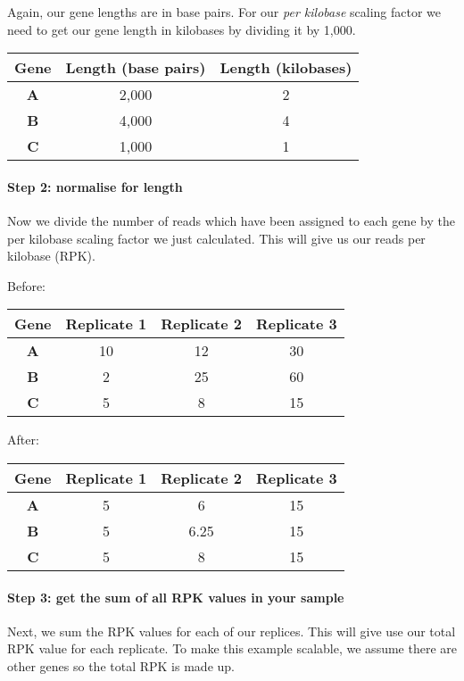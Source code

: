 \documentclass[11pt]{article}
\begin{document}
Again, our gene lengths are in base pairs. For our \textit{per kilobase}
scaling factor we need to get our gene length in kilobases by dividing
it by 1,000.

\begin{longtable}[]{@{}ccc@{}}
\hline
Gene & Length (base pairs) & Length (kilobases)\tabularnewline
\hline
\endhead
\textbf{A} & 2,000 & 2\tabularnewline
\textbf{B} & 4,000 & 4\tabularnewline
\textbf{C} & 1,000 & 1\tabularnewline
\hline
\end{longtable}

\hypertarget{step-2-normalise-for-length}{%
\paragraph{Step 2: normalise for
length}\label{step-2-normalise-for-length}}

Now we divide the number of reads which have been assigned to each gene
by the per kilobase scaling factor we just calculated. This will give us
our reads per kilobase (RPK).

Before:

\begin{longtable}[]{@{}cccc@{}}
\hline
Gene & Replicate 1 & Replicate 2 & Replicate 3\tabularnewline
\hline
\endhead
\textbf{A} & 10 & 12 & 30\tabularnewline
\textbf{B} & 2 & 25 & 60\tabularnewline
\textbf{C} & 5 & 8 & 15\tabularnewline
\hline
\end{longtable}

After:

\begin{longtable}[]{@{}cccc@{}}
\hline
Gene & Replicate 1 & Replicate 2 & Replicate 3\tabularnewline
\hline
\endhead
\textbf{A} & 5 & 6 & 15\tabularnewline
\textbf{B} & 5 & 6.25 & 15\tabularnewline
\textbf{C} & 5 & 8 & 15\tabularnewline
\hline
\end{longtable}

\hypertarget{step-3-get-the-sum-of-all-rpk-values-in-your-sample}{%
\paragraph{Step 3: get the sum of all RPK values in your
sample}\label{step-3-get-the-sum-of-all-rpk-values-in-your-sample}}

Next, we sum the RPK values for each of our replices. This will give use
our total RPK value for each replicate. To make this example scalable,
we assume there are other genes so the total RPK is made up.
\end{document}
